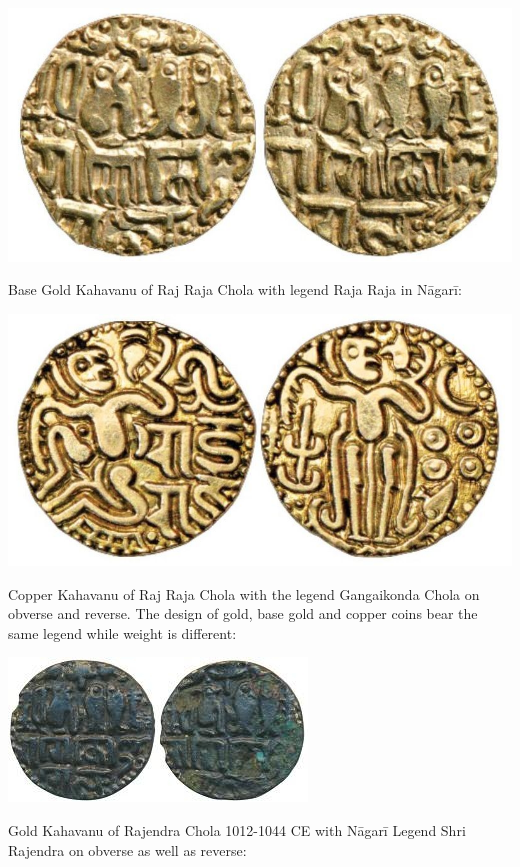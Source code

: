 \vskip 4pt

\centerline{\includegraphics[scale=1]{"images/article-06/art06-fig10.jpg"}}

Base Gold Kahavanu of Raj Raja Chola with legend Raja Raja in Nāgarī:

\vskip 4pt

\centerline{\includegraphics[scale=1]{"images/article-06/art06-fig11.jpg"}}

Copper Kahavanu of Raj Raja Chola with the legend Gangaikonda Chola on obverse and reverse. The design of gold, base gold and copper coins bear the same legend while weight is different:

\centerline{\includegraphics[scale=0.6]{"images/article-06/art06-fig12.jpg"}}

Gold Kahavanu of Rajendra Chola 1012-1044 CE with Nāgarī Legend Shri Rajendra on obverse as well as reverse:

